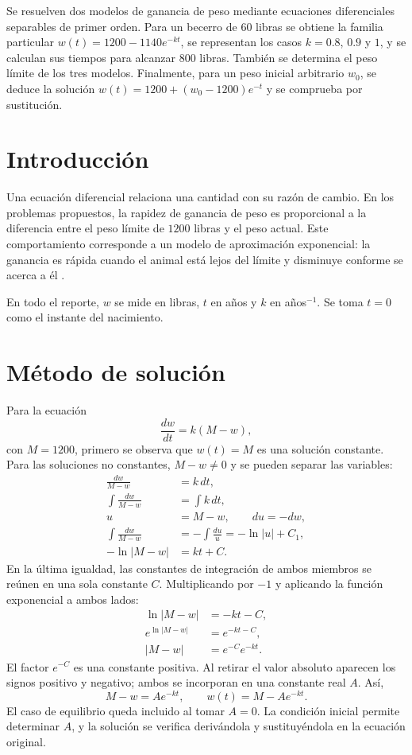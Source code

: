 \begin{abstractd}
Se resuelven dos modelos de ganancia de peso mediante ecuaciones diferenciales separables de primer orden. Para un becerro de 60 libras se obtiene la familia particular $w(t)=1200-1140e^{-kt}$, se representan los casos $k=0.8$, $0.9$ y $1$, y se calculan sus tiempos para alcanzar 800 libras. También se determina el peso límite de los tres modelos. Finalmente, para un peso inicial arbitrario $w_0$, se deduce la solución $w(t)=1200+(w_0-1200)e^{-t}$ y se comprueba por sustitución.
\end{abstractd}

\templateIndex

\section{Introducción}
Una ecuación diferencial relaciona una cantidad con su razón de cambio. En los problemas propuestos, la rapidez de ganancia de peso es proporcional a la diferencia entre el peso límite de $1200$ libras y el peso actual. Este comportamiento corresponde a un modelo de aproximación exponencial: la ganancia es rápida cuando el animal está lejos del límite y disminuye conforme se acerca a él \citep{stewart2016calculus,openstax2016calculus2}.

En todo el reporte, $w$ se mide en libras, $t$ en años y $k$ en años$^{-1}$. Se toma $t=0$ como el instante del nacimiento.

\section{Método de solución}
Para la ecuación
\[
 \frac{dw}{dt}=k(M-w),
\]
con $M=1200$, primero se observa que $w(t)=M$ es una solución constante. Para las soluciones no constantes, $M-w\neq0$ y se pueden separar las variables:
\begin{align*}
 \frac{dw}{M-w}&=k\,dt,\\
 \int\frac{dw}{M-w}&=\int k\,dt,\\
 u&=M-w,\qquad du=-dw,\\
 \int\frac{dw}{M-w}&=-\int\frac{du}{u}=-\ln|u|+C_1,\\
 -\ln|M-w|&=kt+C.
\end{align*}
En la última igualdad, las constantes de integración de ambos miembros se reúnen en una sola constante $C$. Multiplicando por $-1$ y aplicando la función exponencial a ambos lados:
\begin{align*}
 \ln|M-w|&=-kt-C,\\
 e^{\ln|M-w|}&=e^{-kt-C},\\
 |M-w|&=e^{-C}e^{-kt}.
\end{align*}
El factor $e^{-C}$ es una constante positiva. Al retirar el valor absoluto aparecen los signos positivo y negativo; ambos se incorporan en una constante real $A$. Así,
\[
 M-w=Ae^{-kt},
 \qquad
 \boxed{w(t)=M-Ae^{-kt}}.
\]
El caso de equilibrio queda incluido al tomar $A=0$. La condición inicial permite determinar $A$, y la solución se verifica derivándola y sustituyéndola en la ecuación original.

